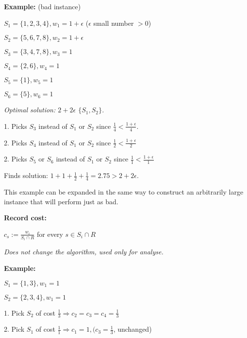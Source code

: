 \documentclass{proc}
\begin{document}
\begin{mdframed}
    \textbf{Example:} (bad instance)
    
    $S_{1} = \{1,2,3,4\}, w_{1} = 1 + \epsilon$ ($\epsilon$ small number $> 0$)
    
    $S_{2} = \{5,6,7,8\}, w_{2} = 1 + \epsilon$
    
    $S_{3} = \{3,4,7,8\}, w_{3} = 1$
    
    $S_{4} = \{2, 6\}, w_{4} = 1$
    
    $S_{5} = \{1\}, w_{5} = 1$
    
    $S_{6} = \{5\}, w_{6} = 1$
    
    \vspace{2ex}
    
    \textit{Optimal solution: $2 + 2\epsilon$ $\{S_{1}, S_{2}\}$.}
    
    \vspace{2ex}
    
    1. Picks $S_{3}$ instead of $S_{1}$ or $S_{2}$ since $\frac{1}{4} < \frac{1 + \epsilon}{4}$.
    
    2. Picks $S_{4}$ instead of $S_{1}$ or $S_{2}$ since $\frac{1}{2} < \frac{1 + \epsilon}{2}$
    
    2. Picks $S_{5}$ or $S_{6}$ instead of $S_{1}$ or $S_{2}$ since $\frac{1}{1} < \frac{1 + \epsilon}{1}$
    
    Finds solution: $1 + 1 + \frac{1}{2} + \frac{1}{4} = 2.75 > 2 + 2\epsilon$.
    
    This example can be expanded in the same way to construct an arbitrarily large instance that will perform just as bad.
\end{mdframed}

\begin{mdframed}
    \textbf{Record cost:}

    $c_{s} := \frac{w_{i}}{S_{i} \cap R}$ for every $s \in S_{i} \cap R$
    
    \textit{Does not change the algorithm, used only for analyse.}
\end{mdframed}

\begin{mdframed}
    \textbf{Example:}
    
    $S_{1} = \{1, 3\}, w_{1} = 1$
    
    $S_{2} = \{2,3,4\}, w_{1} = 1$
    
    1. Pick $S_{2}$ of cost $\frac{1}{3} \Rightarrow c_{2} = c_{3} = c_{4} = \frac{1}{3}$
    
    2. Pick $S_{1}$ of cost $\frac{1}{1} \Rightarrow c_{1} = 1, (c_{3} = \frac{1}{3}$, unchanged)
\end{mdframed}
\end{document}
